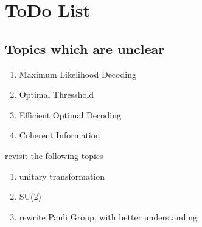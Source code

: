 \section{ToDo List}

\subsection{Topics which are unclear}

\begin{enumerate}
    \item Maximum Likelihood Decoding 
    \item Optimal Thresshold
    \item Efficient Optimal Decoding
    \item Coherent Information
\end{enumerate}

revisit the following topics

\begin{enumerate}
    \item unitary transformation
    \item SU(2)
    \item rewrite Pauli Group, with better understanding
\end{enumerate}